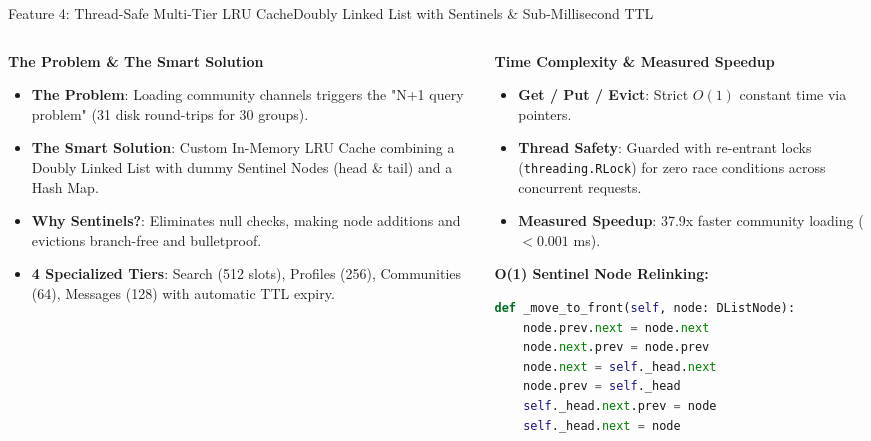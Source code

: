 \documentclass[aspectratio=169,10pt]{beamer}
\begin{document}
\begin{frame}[fragile,t]{Feature 4: Thread-Safe Multi-Tier LRU Cache}{Doubly Linked List with Sentinels \& Sub-Millisecond TTL}
  \begin{columns}[t]
    \begin{column}{0.48\textwidth}
      {\fontsize{9.0}{11.0}\selectfont\textbf{\textcolor{KoinexaRed}{The Problem \& The Smart Solution}}}\par\vspace{1.5pt}
      \begin{itemize}\setlength{\itemsep}{1.5pt}
        \item {\fontsize{8.0}{9.8}\selectfont \textbf{The Problem}: Loading community channels triggers the "N+1 query problem" (31 disk round-trips for 30 groups).}
        \item {\fontsize{8.0}{9.8}\selectfont \textbf{The Smart Solution}: Custom In-Memory LRU Cache combining a Doubly Linked List with dummy Sentinel Nodes (head \& tail) and a Hash Map.}
        \item {\fontsize{8.0}{9.8}\selectfont \textbf{Why Sentinels?}: Eliminates null checks, making node additions and evictions branch-free and bulletproof.}
        \item {\fontsize{8.0}{9.8}\selectfont \textbf{4 Specialized Tiers}: Search (512 slots), Profiles (256), Communities (64), Messages (128) with automatic TTL expiry.}
      \end{itemize}
    \end{column}
    \begin{column}{0.48\textwidth}
      {\fontsize{9.0}{11.0}\selectfont\textbf{\textcolor{KoinexaOrange}{Time Complexity \& Measured Speedup}}}\par\vspace{1.5pt}
      \begin{itemize}\setlength{\itemsep}{1.2pt}
        \item {\fontsize{8.0}{9.8}\selectfont \textbf{Get / Put / Evict}: Strict $O(1)$ constant time via pointers.}
        \item {\fontsize{8.0}{9.8}\selectfont \textbf{Thread Safety}: Guarded with re-entrant locks (\texttt{threading.RLock}) for zero race conditions across concurrent requests.}
        \item {\fontsize{8.0}{9.8}\selectfont \textbf{Measured Speedup}: 37.9x faster community loading ($< 0.001$ ms).}
      \end{itemize}
      \vspace{0.1cm}
      {\fontsize{8.0}{10.0}\selectfont\textbf{\textcolor{KoinexaRed}{O(1) Sentinel Node Relinking:}}}
\begin{lstlisting}[language=Python]
def _move_to_front(self, node: DListNode):
    node.prev.next = node.next
    node.next.prev = node.prev
    node.next = self._head.next
    node.prev = self._head
    self._head.next.prev = node
    self._head.next = node
\end{lstlisting}
    \end{column}
  \end{columns}
\end{frame}
\end{document}
